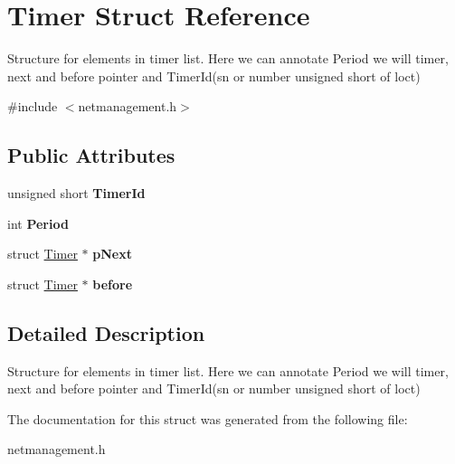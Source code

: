 \hypertarget{structTimer}{\section{\-Timer \-Struct \-Reference}
\label{structTimer}
}


\-Structure for elements in timer list. \-Here we can annotate \-Period we will timer, next and before pointer and \-Timer\-Id(sn or number unsigned short of loct) 




{\ttfamily \#include $<$netmanagement.\-h$>$}

\subsection*{\-Public \-Attributes}
\begin{DoxyCompactItemize}
\item 
\hypertarget{structTimer_a78ef815457f971ba6be4fca658cb514e}{unsigned short {\bfseries \-Timer\-Id}}\label{structTimer_a78ef815457f971ba6be4fca658cb514e}

\item 
\hypertarget{structTimer_a4fdfac50832a97b7e98f1eda6b3bcff1}{int {\bfseries \-Period}}\label{structTimer_a4fdfac50832a97b7e98f1eda6b3bcff1}

\item 
\hypertarget{structTimer_adeae7d4e0be077bfbc805f428352affe}{struct \hyperlink{structTimer}{\-Timer} $\ast$ {\bfseries p\-Next}}\label{structTimer_adeae7d4e0be077bfbc805f428352affe}

\item 
\hypertarget{structTimer_a2f1f1cd31b30c1d57997ece62b4bc9b9}{struct \hyperlink{structTimer}{\-Timer} $\ast$ {\bfseries before}}\label{structTimer_a2f1f1cd31b30c1d57997ece62b4bc9b9}

\end{DoxyCompactItemize}


\subsection{\-Detailed \-Description}
\-Structure for elements in timer list. \-Here we can annotate \-Period we will timer, next and before pointer and \-Timer\-Id(sn or number unsigned short of loct)

\-The documentation for this struct was generated from the following file\-:\begin{DoxyCompactItemize}
\item 
netmanagement.\-h\end{DoxyCompactItemize}
